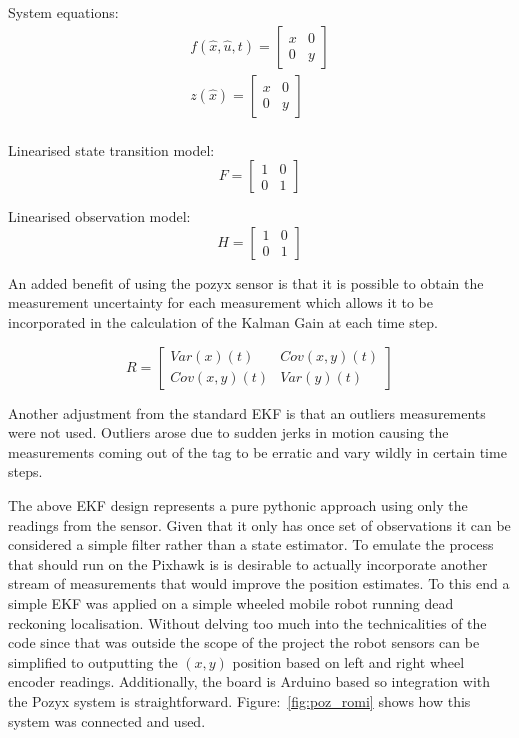 System equations:
\begin{equation*}
    \begin{split}
        f(\hat{x},\hat{u},t) = \left[ \begin{array}{cc}
                              x & 0\\
                              0 & y
        \end{array} \right]\\
        z(\hat{x}) = \left[ \begin{array}{cc}
                              x & 0\\
                              0 & y
        \end{array} \right]\\
    \end{split}
\end{equation*}


Linearised state transition model:
\[
    F =
    \left[ \begin{array}{cc}
    1 & 0\\
    0 & 1
    \end{array}
    \right]
\]

Linearised observation model:
\[
    H =
    \left[ \begin{array}{cc}
    1 & 0\\
    0 & 1
    \end{array}
    \right]
\]

An added benefit of using the pozyx sensor is that it is possible to obtain the measurement uncertainty for each measurement which allows it to be incorporated in the calculation of the Kalman Gain at each time step.

\[
    R =
%
        \left[
            \begin{array}{cc}
                Var(x)(t) & Cov(x,y)(t)\\
                Cov(x,y)(t) & Var(y)(t)
            \end{array}
        \right]
\]

Another adjustment from the standard EKF is that an outliers measurements were not used.
Outliers arose due to sudden jerks in motion causing the measurements coming out of the tag to be erratic and vary wildly in certain time steps.

The above EKF design represents a pure pythonic approach using only the readings from the sensor.
Given that it only has once set of observations it can be considered a simple filter rather than a state estimator.
To emulate the process that should run on the Pixhawk is is desirable to actually incorporate another stream of measurements that would improve the position estimates.
To this end a simple EKF was applied on a simple wheeled mobile robot running dead reckoning localisation.
Without delving too much into the technicalities of the code since that was outside the scope of the project the robot sensors can be simplified to outputting the $(x,y)$ position based on left and right wheel encoder readings.
Additionally, the board is Arduino based so integration with the Pozyx system is straightforward.
Figure:~\ref{fig:poz_romi} shows how this system was connected and used.

